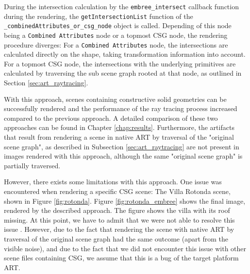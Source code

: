 During the intersection calculation by the \texttt{embree\_intersect} callback function during the rendering, the \texttt{getIntersectionList} function of the \texttt{\_combinedAttributes\_or\_csg\_node} object is called. Depending of this node being a \texttt{Combined Attributes} node or a topmost CSG node, the rendering procedure diverges: For a \texttt{Combined Attributes} node, the intersections are calculated directly on the shape, taking transformation information into account. For a topmost CSG node, the intersections with the underlying primitives are calculated by traversing the sub scene graph rooted at that node, as outlined in Section \ref{sec:art_raytracing}. 

With this approach, scenes containing constructive solid geometries can be successfully rendered and the performance of the ray tracing process increased compared to the previous approach.  A detailed comparison of these two approaches can be found in Chapter \ref{chap:results}. Furthermore, the artifacts that result from rendering a scene in native ART by traversal of the "original scene graph", as described in Subsection \ref{sec:art_raytracing} are not present in images rendered with this approach, although the same "original scene graph" is partially traversed.

However, there exists some limitations with this approach. One issue was encountered when rendering a specific CSG scene: The Villa Rotonda scene, shown in Figure \ref{fig:rotonda}. Figure \ref{fig:rotonda_embree} shows the final image, rendered by the described approach. The figure shows the villa with its roof missing. At this point, we have to admit that we were not able to resolve this issue . However, due to the fact that rendering the scene with native ART by traversal of the original scene graph had the same outcome (apart from the visible noise), and due to the fact that we did not encounter this issue with other scene files containing CSG, we assume that this is a bug of the target platform ART. 







